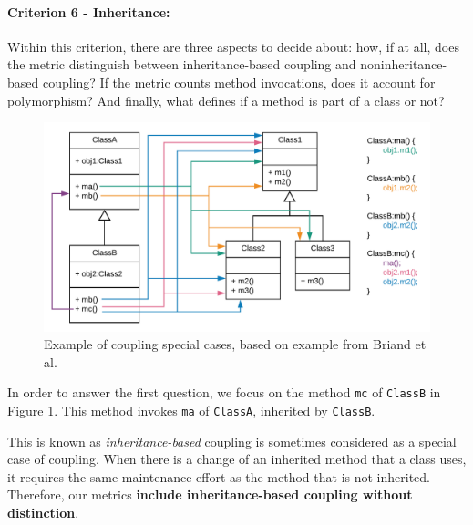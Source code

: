 \paragraph{Criterion 6 - Inheritance:}
Within this criterion, there are three aspects to decide about: how, if at all, does the metric distinguish between inheritance-based coupling and noninheritance-based coupling? If the metric counts method invocations, does it account for polymorphism? And finally, what defines if a method is part of a class or not?

\begin{figure}[ht]
\begin{center}
\includegraphics[width=\textwidth]{figures/specialcases.png}
\caption{Example of coupling special cases, based on example from Briand et al. \cite{briand1999unified}}
\label{fig:specialcases}
\end{center}
\end{figure}

In order to answer the first question, we focus on the method \texttt{mc} of \texttt{ClassB} in Figure \ref{fig:specialcases}. This method invokes \texttt{ma} of \texttt{ClassA}, inherited by \texttt{ClassB}.

This is known as \textit{inheritance-based} coupling is sometimes considered as a special case of coupling.
When there is a change of an inherited method that a class uses, it  requires the same maintenance effort as the method that is not inherited. Therefore, our metrics  \textbf{include inheritance-based coupling without distinction}.

